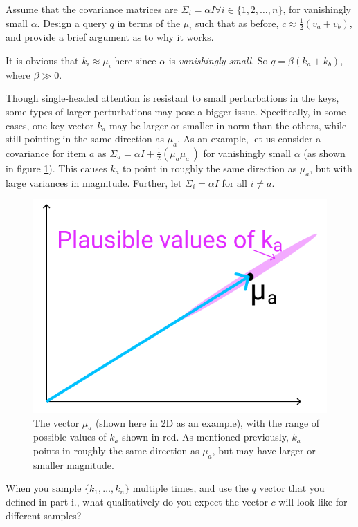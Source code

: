 \begin{parts}
    \begin{subparts}
        \subpart[2] Assume that the covariance matrices are $\Sigma_i = \alpha I \forall i \in \{1, 2, \ldots, n\}$, for vanishingly small $\alpha$.
        Design a query $q$ in terms of the $\mu_i$ such that as before, $c\approx \frac{1}{2}(v_a + v_b)$, and provide a brief argument as to why it works.
        \begin{answer}
            It is obvious that $k_i \approx \mu_i$ here since $\alpha$ is \textit{vanishingly small}.
            So $q = \beta (k_a + k_b)$, where $\beta \gg 0$.
        \end{answer}

        \subpart[3] Though single-headed attention is resistant to small perturbations in the keys, some types of larger perturbations may pose a bigger issue. Specifically, in some cases, one key vector $k_a$ may be larger or smaller in norm than the others, while still pointing in the same direction as $\mu_a$. As an example, let us consider a covariance for item $a$ as $\Sigma_a = \alpha I + \frac{1}{2}(\mu_a\mu_a^\top)$ for vanishingly small $\alpha$ (as shown in figure \ref{ka_plausible}). This causes $k_a$ to point in roughly the same direction as $\mu_a$, but with large variances in magnitude. Further, let $\Sigma_i = \alpha I$ for all $i \neq a$.
        \begin{figure}[h]
            \centering
            \captionsetup{justification=centering,margin=2cm}
            \includegraphics[width=0.35\linewidth]{images/ka_plausible.png}
            \caption{The vector $\mu_a$ (shown here in 2D as an example), with the range of possible values of $k_a$ shown in red. As mentioned previously, $k_a$ points in roughly the same direction as $\mu_a$, but may have larger or smaller magnitude.}
            \label{ka_plausible}
        \end{figure}

        When you sample $\{k_1,\dots,k_n\}$ multiple times, and use the $q$ vector that you defined in part i., what qualitatively do you expect the vector $c$ will look like for different samples?


\end{subparts}
\end{parts}
